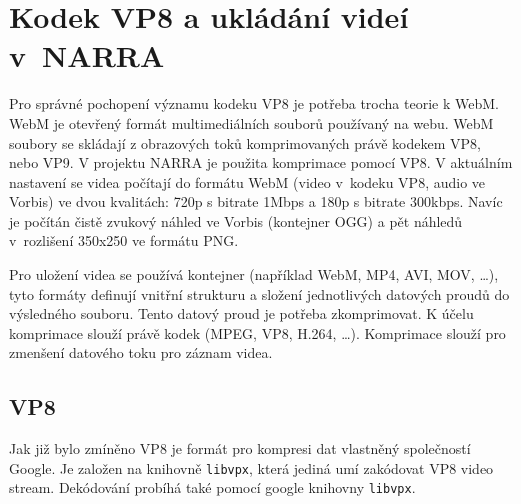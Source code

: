 \section {Kodek VP8 a ukládání videí v~NARRA}
\par Pro správné pochopení významu kodeku VP8\cite{vp8} je potřeba trocha teorie k WebM\cite{webm}. WebM je otevřený formát multimediálních souborů používaný na webu. WebM soubory se skládají z obrazových toků komprimovaných právě kodekem VP8, nebo VP9. V projektu NARRA je použita komprimace pomocí VP8. V aktuálním nastavení se videa počítají do formátu WebM (video v~kodeku VP8, audio ve Vorbis) ve dvou kvalitách: 720p s bitrate 1Mbps a 180p s bitrate 300kbps. Navíc je počítán čistě zvukový náhled ve Vorbis (kontejner OGG) a pět náhledů v~rozlišení 350x250 ve formátu PNG. 
\par Pro uložení videa se používá kontejner (například WebM, MP4, AVI, MOV, \ldots), tyto formáty definují vnitřní strukturu a složení jednotlivých datových proudů do výsledného souboru. Tento datový proud je potřeba zkomprimovat. K účelu komprimace slouží právě kodek (MPEG, VP8, H.264, \ldots). Komprimace slouží pro zmenšení datového toku pro záznam videa.
\subsection{VP8}
\par Jak již bylo zmíněno VP8 je formát pro kompresi dat vlastněný společností Google. Je založen na knihovně \texttt{libvpx}, která jediná umí zakódovat VP8 video stream. Dekódování probíhá také pomocí google knihovny \texttt{libvpx}.